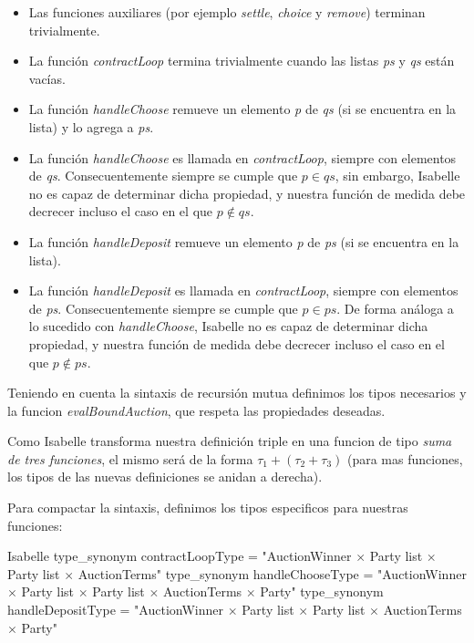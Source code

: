 \documentclass[12pt]{book}
\begin{document}
\begin{itemize}
    \item Las funciones auxiliares (por ejemplo \textit{settle}, \textit{choice} y \textit{remove}) terminan trivialmente.
    \item La función \textit{contractLoop} termina trivialmente cuando las listas \textit{ps} y \textit{qs} están vacías.
    \item La función \textit{handleChoose} remueve un elemento \textit{p} de \textit{qs} (si se encuentra en la lista) y lo agrega a \textit{ps}.
    \item La función \textit{handleChoose} es llamada en \textit{contractLoop}, siempre con elementos de \textit{qs}. Consecuentemente siempre se cumple que $p \in qs$, sin embargo, Isabelle no es capaz de determinar dicha propiedad, y nuestra función de medida debe decrecer incluso el caso en el que $p \notin qs$.
    \item La función \textit{handleDeposit} remueve un elemento \textit{p} de \textit{ps} (si se encuentra en la lista).
    \item La función \textit{handleDeposit} es llamada en \textit{contractLoop}, siempre con elementos de \textit{ps}. Consecuentemente siempre se cumple que $p \in ps$. De forma análoga a lo sucedido con \textit{handleChoose}, Isabelle no es capaz de determinar dicha propiedad, y nuestra función de medida debe decrecer incluso el caso en el que $p \notin ps$.
\end{itemize}

Teniendo en cuenta la sintaxis de recursión mutua definimos los tipos necesarios y la funcion \textit{evalBoundAuction}, que respeta las propiedades deseadas.

Como Isabelle transforma nuestra definición triple en una funcion de tipo \textit{suma de tres funciones}, el mismo será de la forma $\tau_1 + (\tau_2 + \tau_3)$ (para mas funciones, los tipos de las nuevas definiciones se anidan a derecha). 

Para compactar la sintaxis, definimos los tipos especificos para nuestras funciones:

\begin{code}[title=Tipos de datos recibidos por la funciones mutuamente recursivas.]{Isabelle}
type_synonym contractLoopType = "AuctionWinner $\times$ Party list $\times$ Party list $\times$ AuctionTerms"
type_synonym handleChooseType = "AuctionWinner $\times$ Party list $\times$ Party list $\times$ AuctionTerms $\times$ Party"
type_synonym handleDepositType = "AuctionWinner $\times$ Party list $\times$ Party list $\times$ AuctionTerms $\times$ Party"
\end{code}
\end{document}
